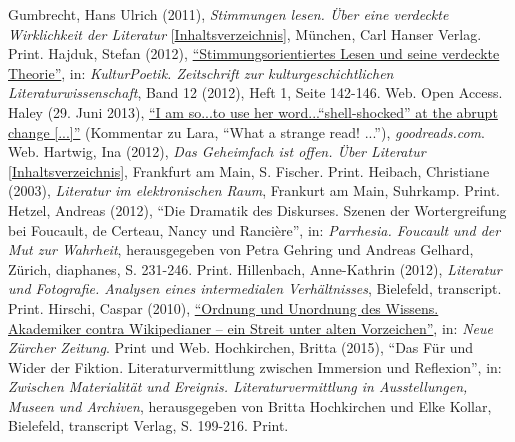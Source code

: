 \documentclass[fontsize=12pt]{scrartcl}
\begin{document}
{{{{\begin{thebibliography}
	Gumbrecht, Hans Ulrich (2011), \textit{Stimmungen lesen. \"Uber eine verdeckte Wirklichkeit der Li\-te\-ra\-tur} [\href{http://scans.hebis.de/23/19/63/23196398_toc.pdf}{Inhaltsverzeichnis}], M\"unchen, Carl Hanser Verlag. Print.
	Hajduk, Stefan (2012), 
\href{http://kulturpoetik.germanistik.uni-saarland.de/manageartikel.php?action=show\&id=333\&resume=rezensionen}{
"`Stim\-mungs\-or\-i\-en\-tier\-tes Lesen und seine verdeckte Theorie"'}, in: \textit{KulturPoetik. Zeit\-schrift zur kul\-tur\-ge\-schicht\-li\-chen Li\-te\-ra\-tur\-wis\-sen\-schaft}, Band 12 (2012), Heft 1, Seite 142-146. Web. Open Access.
	Haley (29. Juni 2013), \href{https://www.goodreads.com/review/show/31104294?page=1\#comment_77325756}{"`I am so...to use her word..."`shell-shocked"' at the abrupt change [...]"'} (Kommentar zu Lara, "`What a strange read! ..."'), \textit{goodreads.com}. Web.
	Hartwig, Ina (2012), \textit{Das Geheimfach ist offen. \"Uber Li\-te\-ra\-tur\-} [\href{http://d-nb.info/1017385424/04}{Inhaltsverzeichnis}], Frankfurt am Main, S. Fischer. Print.
	Heibach, Christiane (2003), \textit{Li\-te\-ra\-tur im elektronischen Raum}, Frankurt am Main, Suhr\-kamp. Print.
	Hetzel, Andreas (2012), "`Die Dramatik des Diskurses. Szenen der Wortergreifung bei Foucault, de Certeau, Nancy und Ranci\`{e}re"', in: \textit{Parrhesia. Foucault und der Mut zur Wahrheit}, he\-rausgegeben von Petra Gehring und Andreas Gelhard, Z\"urich, diaphanes, S. 231-246. Print.
	Hillenbach, Anne-Kathrin (2012), \textit{Li\-te\-ra\-tur und Fotografie. Ana\-lysen eines intermedialen Verh\"altnisses}, Bielefeld, transcript. Print.
	Hirschi, Caspar (2010), \href{http://www.nzz.ch/nachrichten/kultur/literatur_und_kunst/ordnung-und-unordnung-des-wissens-1.4941730}{"`Ordnung und Unordnung des Wissens. \flq Akademiker\frq \,\,contra \flq Wi\-ki\-pe\-dianer\frq \,\,-- ein Streit unter alten Vorzeichen"'}, in: \textit{Neue Z\"urcher Zeitung}. Print und Web.
	Hochkirchen, Britta (2015), "`Das F\"ur und Wider der Fiktion. Li\-te\-ra\-tur\-ver\-mitt\-lung zwi\-schen Im\-mersion und Reflexion"', in: \textit{Zwischen Materialit\"at und Ereignis. Li\-te\-ra\-tur\-ver\-mitt\-lung in Ausstellungen, Museen und Archiven}, he\-rausgegeben von Britta Hochkirchen und Elke Kollar, Bielefeld, transcript Verlag, S. 199-216. Print.

\end{thebibliography}}}}}
\end{document}
